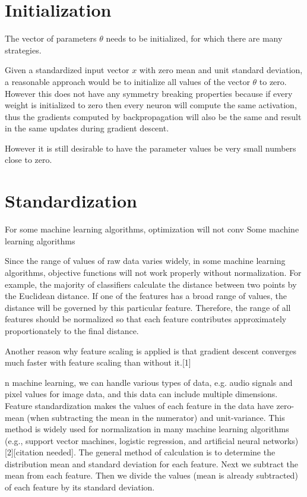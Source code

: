 \section{Initialization}

The vector of parameters $\theta$ needs to be initialized, for which there are many strategies.

Given a standardized input vector $x$ with zero mean and unit standard deviation, a reasonable approach would be to initialize all values of the vector $\theta$ to zero. However this does not have any symmetry breaking properties because if every weight is initialized to zero then every neuron will compute the same activation, thus the gradients computed by backpropagation will also be the same and result in the same updates during gradient descent.

However it is still desirable to have the parameter values be very small numbers close to zero.

\section{Standardization}

For some machine learning algorithms, optimization will not conv
Some machine learning algorithms


Since the range of values of raw data varies widely, in some machine learning algorithms, objective functions will not work properly without normalization. For example, the majority of classifiers calculate the distance between two points by the Euclidean distance. If one of the features has a broad range of values, the distance will be governed by this particular feature. Therefore, the range of all features should be normalized so that each feature contributes approximately proportionately to the final distance.

Another reason why feature scaling is applied is that gradient descent converges much faster with feature scaling than without it.[1]

n machine learning, we can handle various types of data, e.g. audio signals and pixel values for image data, and this data can include multiple dimensions. Feature standardization makes the values of each feature in the data have zero-mean (when subtracting the mean in the numerator) and unit-variance. This method is widely used for normalization in many machine learning algorithms (e.g., support vector machines, logistic regression, and artificial neural networks)[2][citation needed]. The general method of calculation is to determine the distribution mean and standard deviation for each feature. Next we subtract the mean from each feature. Then we divide the values (mean is already subtracted) of each feature by its standard deviation.

